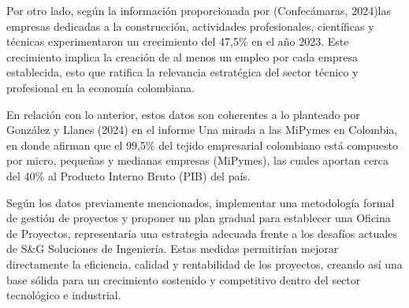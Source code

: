 Por otro lado, según la información proporcionada por (Confecámaras, 2024)las empresas dedicadas a la construcción, actividades profesionales, científicas y técnicas experimentaron un crecimiento del 47,5\% en el año 2023. Este crecimiento implica la creación de al menos un empleo por cada empresa establecida, esto que ratifica la relevancia estratégica del sector técnico y profesional en la economía colombiana.

En relación con lo anterior, estos datos son coherentes a lo planteado por González y Llanes (2024) en el informe Una mirada a las MiPymes en Colombia, en donde afirman que el 99,5\% del tejido empresarial colombiano está compuesto por micro, pequeñas y medianas empresas (MiPymes), las cuales aportan cerca del 40\% al Producto Interno Bruto (PIB) del país.

Según los datos previamente mencionados, implementar una metodología formal de gestión de proyectos y proponer un plan gradual para establecer una Oficina de Proyectos, representaría una estrategia adecuada frente a los desafíos actuales de S\&G Soluciones de Ingeniería. Estas medidas permitirían mejorar directamente la eficiencia, calidad y rentabilidad de los proyectos, creando así una base sólida para un crecimiento sostenido y competitivo dentro del sector tecnológico e industrial. 
